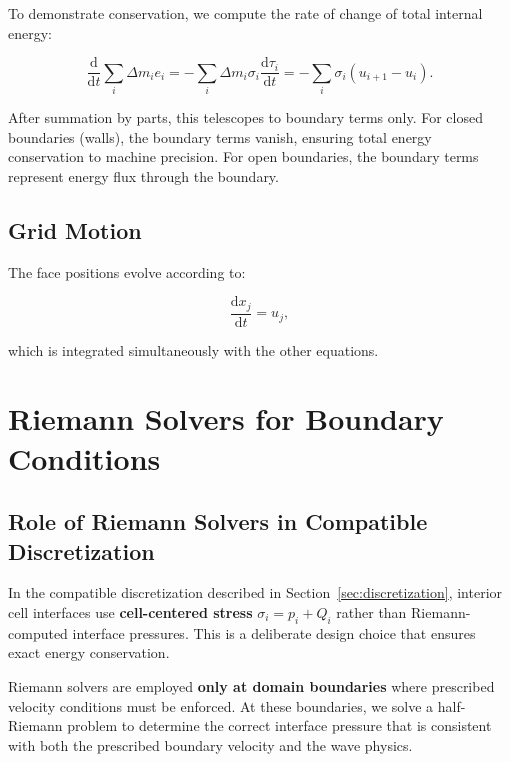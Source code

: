 \documentclass[12pt,a4paper]{article}
\newcommand{\dd}{\mathrm{d}}
\begin{document}
To demonstrate conservation, we compute the rate of change of total internal energy:

\begin{equation}
    \frac{\dd}{\dd t} \sum_i \Delta m_i e_i = -\sum_i \Delta m_i \sigma_i \frac{\dd \tau_i}{\dd t} = -\sum_i \sigma_i (u_{i+1} - u_i).
    \label{eq:internal_energy_rate}
\end{equation}

After summation by parts, this telescopes to boundary terms only. For closed boundaries (walls), the boundary terms vanish, ensuring total energy conservation to machine precision. For open boundaries, the boundary terms represent energy flux through the boundary.

\subsection{Grid Motion}

The face positions evolve according to:

\begin{equation}
    \frac{\dd x_j}{\dd t} = u_j,
    \label{eq:grid_motion}
\end{equation}

\noindent which is integrated simultaneously with the other equations.

\section{Riemann Solvers for Boundary Conditions}
\label{sec:riemann}

\subsection{Role of Riemann Solvers in Compatible Discretization}

In the compatible discretization described in Section~\ref{sec:discretization}, interior cell interfaces use \textbf{cell-centered stress} $\sigma_i = p_i + Q_i$ rather than Riemann-computed interface pressures. This is a deliberate design choice that ensures exact energy conservation.

Riemann solvers are employed \textbf{only at domain boundaries} where prescribed velocity conditions must be enforced. At these boundaries, we solve a half-Riemann problem to determine the correct interface pressure that is consistent with both the prescribed boundary velocity and the wave physics.
\end{document}
